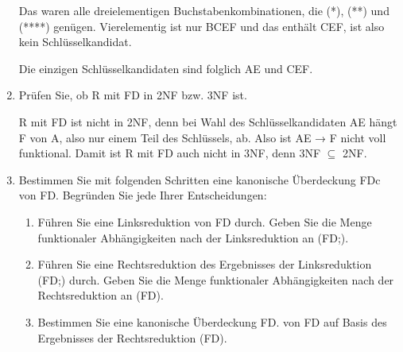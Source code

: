\documentclass{lehramt-informatik-aufgabe}
\begin{document}
\begin{enumerate}
\begin{liAntwort}
Das waren alle dreielementigen Buchstabenkombinationen, die (*), (**)
und (****) genügen. Vierelementig ist nur BCEF und das enthält CEF, ist
also kein Schlüsselkandidat.

Die einzigen Schlüsselkandidaten sind folglich AE und CEF.
\end{liAntwort}


\item Prüfen Sie, ob R mit FD in 2NF bzw. 3NF ist.

\begin{liAntwort}
R mit FD ist nicht in 2NF, denn bei Wahl des Schlüsselkandidaten AE
hängt F von A, also nur einem Teil des Schlüssels, ab. Also ist AE → F
nicht voll funktional. Damit ist R mit FD auch nicht in 3NF, denn 3NF
$\subseteq$ 2NF.
\end{liAntwort}


\item Bestimmen Sie mit folgenden Schritten eine kanonische Überdeckung
FDc von FD. Begründen Sie jede Ihrer Entscheidungen:

\begin{enumerate}


\item Führen Sie eine Linksreduktion von FD durch. Geben Sie die Menge
funktionaler Abhängigkeiten nach der Linksreduktion an (FD;).

\begin{liAntwort}
\end{liAntwort}


\item Führen Sie eine Rechtsreduktion des Ergebnisses der Linksreduktion
(FD;) durch. Geben Sie die Menge funktionaler Abhängigkeiten nach der
Rechtsreduktion an (FD).

\begin{liAntwort}
\end{liAntwort}


\item Bestimmen Sie eine kanonische Überdeckung FD. von FD auf Basis des
Ergebnisses der Rechtsreduktion (FD).

\begin{liAntwort}
\end{liAntwort}


\end{enumerate}
\end{enumerate}
\end{document}
